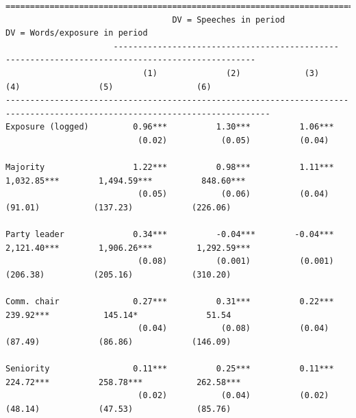 \documentclass[letter,12pt]{article}
\begin{document}
\begin{table} \centering 
  \begin{tiny}
    \begin{verbatim}
============================================================================================================================
                                  DV = Speeches in period                           DV = Words/exposure in period           
                      ----------------------------------------------     ---------------------------------------------------
                            (1)              (2)             (3)             (4)                (5)                 (6)       
----------------------------------------------------------------------------------------------------------------------------
Exposure (logged)         0.96***          1.30***          1.06***                                                           
                           (0.02)           (0.05)          (0.04)                                                            
                                                                                                                              
Majority                  1.22***          0.98***          1.11***       1,032.85***        1,494.59***          848.60***   
                           (0.05)           (0.06)          (0.04)          (91.01)           (137.23)            (226.06)    
                                                                                                                              
Party leader              0.34***          -0.04***        -0.04***       2,121.40***        1,906.26***         1,292.59***  
                           (0.08)          (0.001)          (0.001)         (206.38)          (205.16)            (310.20)    
                                                                                                                              
Comm. chair               0.27***          0.31***          0.22***        239.92***           145.14*              51.54     
                           (0.04)           (0.08)          (0.04)          (87.49)            (86.86)            (146.09)    
                                                                                                                              
Seniority                 0.11***          0.25***          0.11***        224.72***          258.78***           262.58***   
                           (0.02)           (0.04)          (0.02)          (48.14)            (47.53)             (85.76)    
                                                                                                                              

\end{verbatim}
\end{tiny}
\end{table}
\end{document}
